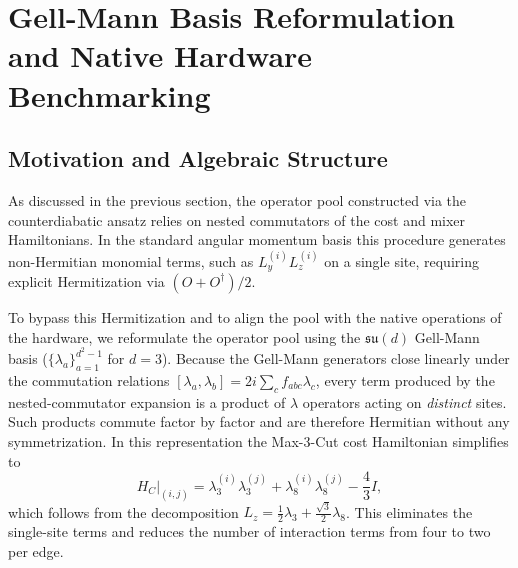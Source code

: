 %

\section{Gell-Mann Basis Reformulation and Native Hardware Benchmarking}
\label{sec:gell_mann}

\subsection{Motivation and Algebraic Structure}
As discussed in the previous section, the operator pool constructed via the counterdiabatic ansatz relies on nested commutators of the cost and mixer Hamiltonians. In the standard angular momentum basis this procedure generates non-Hermitian monomial terms, such as $L_y^{(i)} L_z^{(i)}$ on a single site, requiring explicit Hermitization via $(O + O^\dagger)/2$.

To bypass this Hermitization and to align the pool with the native operations of the hardware, we reformulate the operator pool using the $\mathfrak{su}(d)$ Gell-Mann basis ($\{\lambda_a\}_{a=1}^{d^2-1}$ for $d=3$). Because the Gell-Mann generators close linearly under the commutation relations $[\lambda_a, \lambda_b] = 2i \sum_{c} f_{abc} \lambda_c$, every term produced by the nested-commutator expansion is a product of $\lambda$ operators acting on \emph{distinct} sites. Such products commute factor by factor and are therefore Hermitian without any symmetrization. In this representation the Max-3-Cut cost Hamiltonian simplifies to
\begin{equation}
H_C\big|_{(i,j)} = \lambda_3^{(i)}\lambda_3^{(j)} + \lambda_8^{(i)}\lambda_8^{(j)} - \frac{4}{3}I,
\end{equation}
which follows from the decomposition $L_z = \tfrac{1}{2}\lambda_3 + \tfrac{\sqrt{3}}{2}\lambda_8$. This eliminates the single-site terms and reduces the number of interaction terms from four to two per edge.

